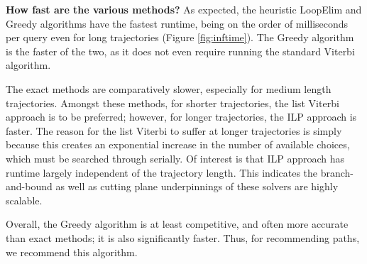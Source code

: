 \textbf{How fast are the various methods?}
As expected, the heuristic {\sc LoopElim} and {\sc Greedy} algorithms have the fastest runtime, being on the order of milliseconds per query even for long trajectories (Figure \ref{fig:inftime}).
The {\sc Greedy} algorithm is the faster of the two, as it does not even require running the standard Viterbi algorithm.

The exact methods are comparatively slower, especially for medium length trajectories.
Amongst these methods, for shorter trajectories, the list Viterbi approach is to be preferred;
however, for longer trajectories, the ILP approach is faster.
The reason for the list Viterbi to suffer at longer trajectories is simply because this creates an exponential increase in the number of available choices, which must be searched through serially.
Of interest is that ILP approach has runtime largely independent of the trajectory length.
This indicates the branch-and-bound as well as cutting plane underpinnings of these solvers are highly scalable.

Overall, the {\sc Greedy} algorithm is at least competitive, and often more accurate than exact methods;
it is also significantly faster.
Thus, for recommending paths, we recommend this algorithm.



